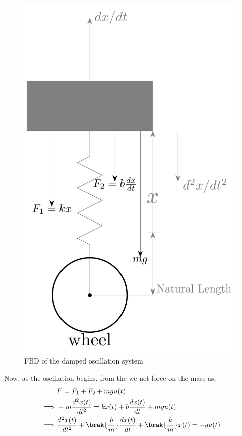 \documentclass[journal,12pt,twocolumn]{IEEEtran}
\theoremstyle{remark}
\begin{document}
    \begin{figure}[h]
        \centering
        \includegraphics[width=0.5\columnwidth]{ncert-physics/11/14/figs/11_14_21_fbd.pdf}
        \caption{FBD of the damped oscillation system}
        \label{fig:Fig-1}
    \end{figure}

    Now, as the oscillation begins, from the  we net force on the mass as,
    \begin{align}
        &F=F_{1}+F_{2}+mgu(t) \label{eq:3}\\
        \implies &-m\frac{d^2x(t)}{dt^2}=kx(t)+b\frac{dx(t)}{dt}+mgu(t) \label{eq:4}\\
        \implies &\frac{d^2x(t)}{dt^2}+\brak{\frac{b}{m}}\frac{dx(t)}{dt}+\brak{\frac{k}{m}}x(t)=-gu(t) \label{eq:5}
    \end{align}
\end{document}
